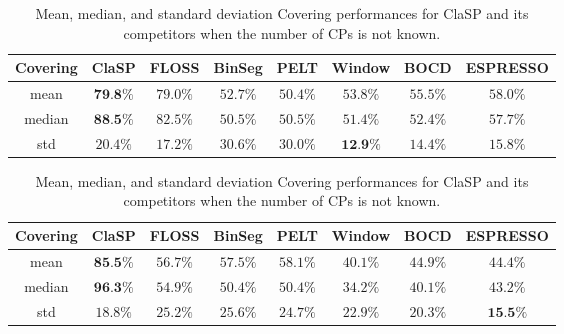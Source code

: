 \documentclass[pdflatex,sn-basic]{sn-jnl}
\begin{document}
\begin{table}[t]
	\caption{Mean, median, and standard deviation Covering performances for ClaSP and its competitors when the number of CPs is not known.\label{tab:unsupervised_summary}}

	\begin{minipage}{12cm}
    	\begin{centering}
    		\begin{tabular}{c|ccccccc}
    			\toprule 			
    			Covering & ClaSP & FLOSS & BinSeg & PELT & Window & BOCD & ESPRESSO\tabularnewline
    			\hline 
    			 mean & $\textbf{79.8\%}$ & $79.0\%$ & $52.7\%$ & $50.4\%$ & $53.8\%$ & $55.5\%$ & $58.0\%$ \tabularnewline
    			 median & $\textbf{88.5\%}$ & $82.5\%$ & $50.5\%$ & $50.5\%$ & $51.4\%$ & $52.4\%$ & $57.7\%$ \tabularnewline
    			 std & $20.4\%$ & $17.2\%$ & $30.6\%$ & $30.0\%$ & $\textbf{12.9\%}$ & $14.4\%$ & $15.8\%$ \tabularnewline
    			\bottomrule 			
    		\end{tabular}
    	\par\end{centering}
	\end{minipage}

	\begin{minipage}{12cm}
    	\begin{centering}
    		\begin{tabular}{c|ccccccc}
    			\toprule 			
    			Covering & ClaSP & FLOSS & BinSeg & PELT & Window & BOCD & ESPRESSO\tabularnewline
    			\hline 
    			 mean & $\textbf{85.5\%}$ & $56.7\%$ & $57.5\%$ & $58.1\%$ & $40.1\%$ & $44.9\%$ & $44.4\%$ \tabularnewline
    			 median & $\textbf{96.3\%}$ & $54.9\%$ & $50.4\%$ & $50.4\%$ & $34.2\%$ & $40.1\%$ & $43.2\%$ \tabularnewline
    			 std & $18.8\%$ & $25.2\%$ & $25.6\%$ & $24.7\%$ & $22.9\%$ & $20.3\%$ & $\textbf{15.5\%}$ \tabularnewline
    			\bottomrule 			
    		\end{tabular}
	    \par\end{centering}
	\end{minipage}
	
\end{table}
\end{document}

